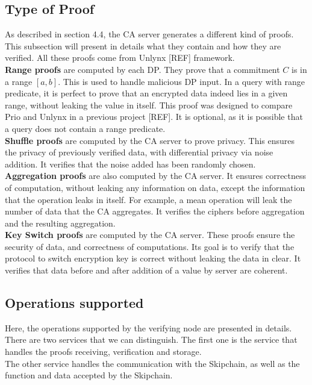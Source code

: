 \documentclass{article}
\begin{document}
\subsection{Type of Proof}
As described in section 4.4, the CA server generates a different kind of proofs. This subsection will present in details what they contain and how they are verified. All these proofs come from Unlynx [REF] framework.\\
\textbf{Range proofs} are computed by each DP. They prove that a commitment $C$ is in a range $[a,b]$. This is used to handle malicious DP input. In a query with range predicate, it is perfect to prove that an encrypted data indeed lies in a given range, without leaking the value in itself. This proof was designed to compare Prio and Unlynx in a previous project [REF]. It is optional, as it is possible that a query does not contain a range predicate.\\
\textbf{Shuffle proofs} are computed by the CA server to prove privacy. This ensures the privacy of previously verified data, with differential privacy via noise addition. It verifies that the noise added has been randomly chosen.\\
\textbf{Aggregation proofs} are also computed by the CA server. It ensures correctness of computation, without leaking any information on data, except the information that the operation leaks in itself. For example, a mean operation will leak the number of data that the CA aggregates. It verifies the ciphers before aggregation and the resulting aggregation.\\
\textbf{Key Switch proofs} are computed by the CA server. These proofs ensure the security of data, and correctness of computations. Its goal is to verify that the protocol to switch encryption key is correct without leaking the data in clear. It verifies that data before and after addition of a value by server are coherent.\\

\subsection{Operations supported}
Here, the operations supported by the verifying node are presented in details.\\
There are two services that we can distinguish. The first one is the service that handles the proofs receiving, verification and storage.\\
The other service handles the communication with the Skipchain, as well as the function and data accepted by the Skipchain. \\ 
\end{document}
